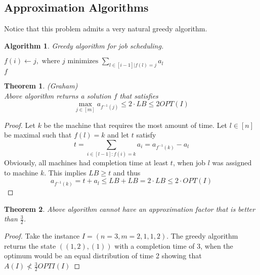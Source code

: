 \documentclass[a4paper, 12pt]{article}
\newtheorem{theorem}{Theorem}[section]
\newtheorem{alg}{Algorithm}[section]
\begin{document}
	\subsection{Approximation Algorithms}
	Notice that this problem admits a very natural greedy algorithm. \begin{alg}
		Greedy algorithm for job scheduling.		\normalfont
		\begin{algorithmic}[1]
			\State $f(i) \gets j, \text{ where $j$ minimizes } \sum_{l \in [i-1] | f(l) = j} a_l$
			\EndFor\\
			\Return $f$
		\end{algorithmic}
	\end{alg}
	\begin{theorem} (Graham)\\
		Above algorithm returns a solution $f$ that satisfies \[\max_{j \in [m]} a_{f^{-1}(j)} \leq 2\cdot LB \leq 2OPT(I)\]
	\end{theorem}
	\begin{proof}
		Let $k$ be the machine that requires the most amount of time. Let $l \in [n]$ be maximal such that $f(l) = k$ and let $t$ satisfy \[t = \sum_{i \in [l-1]: f(i) = k} a_i = a_{f^{-1}(k)} - a_l\]
		Obviously, all machines had completion time at least $t$, when job $l$ was assigned to machine $k$. This implies $LB \geq t$ and thus \[a_{f^{-1}(k)} = t + a_l \leq LB + LB = 2\cdot LB \leq 2\cdot OPT(I)\]
	\end{proof}
	\begin{theorem}
		Above algorithm cannot have an approximation factor that is better than $\frac{3}{2}$.
	\end{theorem}
	\begin{proof}
		Take the instance $I = (n=3,m=2,1,1,2)$. The greedy algorithm returns the state $((1,2),(1))$ with a completion time of 3, when the optimum would be an equal distribution of time 2 showing that $A(I) \not < \frac{3}{2}OPTI(I)$
	\end{proof}
\end{document}
